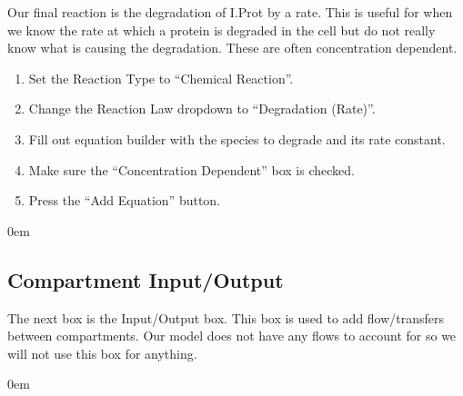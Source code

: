 \documentclass[letterpaper,10pt,english]{sphinxmanual}
\begin{document}
\sphinxAtStartPar
Our final reaction is the degradation of I.Prot by a rate.
This is useful for when we know the rate at which a protein is degraded in
the cell but do not really know what is causing the degradation.
These are often concentration dependent.
\begin{enumerate}
%
\item {} 
\sphinxAtStartPar
Set the Reaction Type to “Chemical Reaction”.

\item {} 
\sphinxAtStartPar
Change the Reaction Law dropdown to “Degradation (Rate)”.

\item {} 
\sphinxAtStartPar
Fill out equation builder with the species to degrade and its rate constant.

\item {} 
\sphinxAtStartPar
Make sure the “Concentration Dependent” box is checked.

\item {} 
\sphinxAtStartPar
Press the “Add Equation” button.

\end{enumerate}


\begin{DUlineblock}{0em}
\item[] 
\end{DUlineblock}


\subsection{Compartment Input/Output}
\label{\detokenize{pages/tutorial_sc/compartmentIO:compartment-input-output}}\label{\detokenize{pages/tutorial_sc/compartmentIO::doc}}
\sphinxAtStartPar
The next box is the Input/Output box.  This box is used to add flow/transfers
between compartments.  Our model does not have any flows to account for so we
will not use this box for anything.


\begin{DUlineblock}{0em}
\item[] 
\end{DUlineblock}
\end{document}
